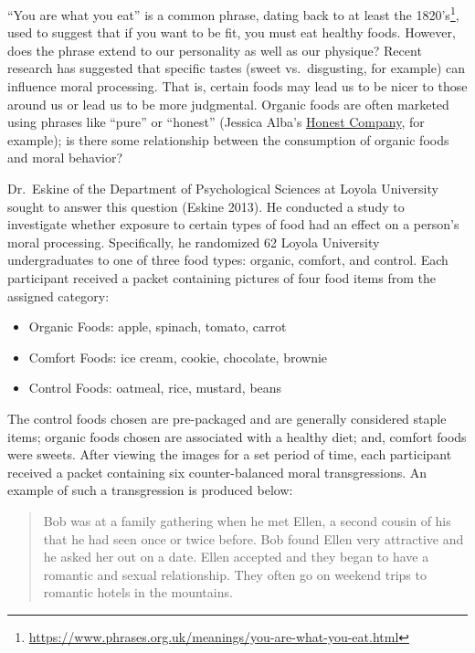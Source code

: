 \documentclass[
  letterpaper,
  DIV=11,
  numbers=noendperiod]{scrreprt}
\providecommand{\tightlist}{%
  \setlength{\itemsep}{0pt}\setlength{\parskip}{0pt}}\usepackage{longtable,booktabs,array}
\theoremstyle{definition}
\theoremstyle{definition}
\theoremstyle{plain}
\theoremstyle{remark}
\begin{document}
``You are what you eat'' is a common phrase, dating back to at least the
1820's\footnote{\url{https://www.phrases.org.uk/meanings/you-are-what-you-eat.html}},
used to suggest that if you want to be fit, you must eat healthy foods.
However, does the phrase extend to our personality as well as our
physique? Recent research has suggested that specific tastes (sweet
vs.~disgusting, for example) can influence moral processing. That is,
certain foods may lead us to be nicer to those around us or lead us to
be more judgmental. Organic foods are often marketed using phrases like
``pure'' or ``honest'' (Jessica Alba's
\href{https://www.honest.com/}{Honest Company}, for example); is there
some relationship between the consumption of organic foods and moral
behavior?

Dr.~Eskine of the Department of Psychological Sciences at Loyola
University sought to answer this question (Eskine 2013). He conducted a
study to investigate whether exposure to certain types of food had an
effect on a person's moral processing. Specifically, he randomized 62
Loyola University undergraduates to one of three food types: organic,
comfort, and control. Each participant received a packet containing
pictures of four food items from the assigned category:

\begin{itemize}
\tightlist
\item
  Organic Foods: apple, spinach, tomato, carrot
\item
  Comfort Foods: ice cream, cookie, chocolate, brownie
\item
  Control Foods: oatmeal, rice, mustard, beans
\end{itemize}

The control foods chosen are pre-packaged and are generally considered
staple items; organic foods chosen are associated with a healthy diet;
and, comfort foods were sweets. After viewing the images for a set
period of time, each participant received a packet containing six
counter-balanced moral transgressions. An example of such a
transgression is produced below:

\begin{quote}
Bob was at a family gathering when he met Ellen, a second cousin of his
that he had seen once or twice before. Bob found Ellen very attractive
and he asked her out on a date. Ellen accepted and they began to have a
romantic and sexual relationship. They often go on weekend trips to
romantic hotels in the mountains.
\end{quote}
\end{document}
